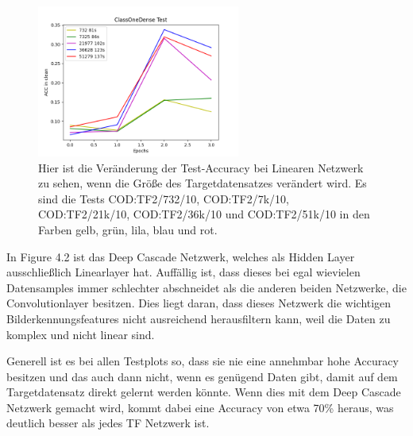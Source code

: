 \begin{figure}[htpb]
    \centering
    \includegraphics[height=5cm]{../../Plots/ba_plots/targetgroesse/cod_ts.png}
    \caption{\label{fig:targetgroesselinear} 
    \small{Hier ist die Veränderung der Test-Accuracy bei Linearen Netzwerk zu sehen, wenn die Größe des Targetdatensatzes verändert wird. 
    Es sind die Tests COD:TF2/732/10, COD:TF2/7k/10, COD:TF2/21k/10, COD:TF2/36k/10 und COD:TF2/51k/10 in den Farben gelb, grün, lila, blau und 
    rot. }}
\end{figure}

In Figure 4.2 ist das Deep Cascade Netzwerk, welches als Hidden Layer ausschließlich Linearlayer hat. Auffällig ist, dass dieses bei egal 
wievielen Datensamples immer schlechter abschneidet als die anderen beiden Netzwerke, die Convolutionlayer besitzen. 
Dies liegt daran, dass dieses Netzwerk die wichtigen Bilderkennungsfeatures nicht ausreichend herausfiltern kann, weil die Daten zu komplex und 
nicht linear sind. 

Generell ist es bei allen Testplots so, dass sie nie eine annehmbar hohe Accuracy besitzen und das auch dann nicht, wenn es genügend Daten 
gibt, damit auf dem Targetdatensatz direkt gelernt werden könnte. Wenn dies mit dem Deep Cascade Netzwerk gemacht wird, kommt dabei eine 
Accuracy von etwa 70\% heraus, was deutlich besser als jedes TF Netzwerk ist. 
